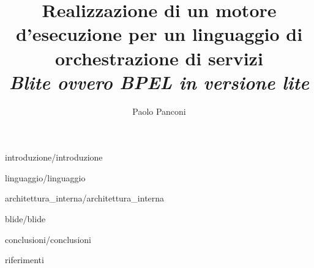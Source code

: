 \documentclass[a4paper,12pt, italian]{book}
\begin{document}
\sloppy

\title{\textsf{ \textbf{Realizzazione di un motore d'esecuzione per un
linguaggio di orchestrazione di servizi} \\ 
\em \large Blite ovvero BPEL in versione lite}\\ } 
\author{Paolo Panconi}

\maketitle


\tableofcontents

\listoffigures
\listoftables

%
%


%
{introduzione/introduzione}


%
{linguaggio/linguaggio}


%
{architettura_interna/architettura_interna}


%
{blide/blide}


%
{conclusioni/conclusioni}


%
{riferimenti}
\end{document}
